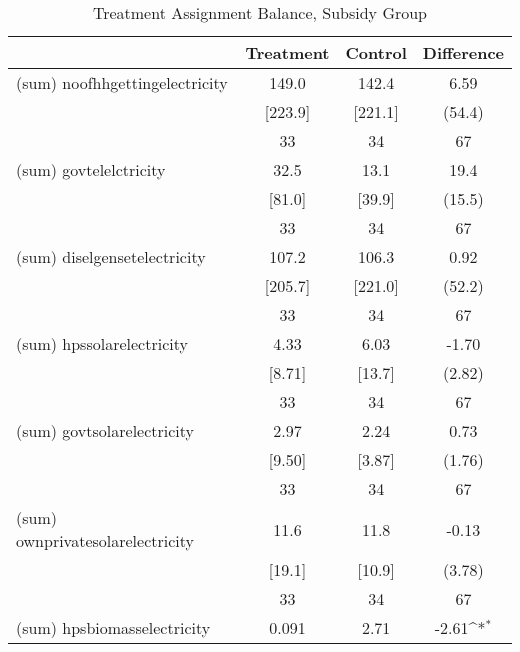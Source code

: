 \begin{table}[htbp]\centering
\def\sym#1{\ifmmode^{#1}\else\(^{#1}\)\fi}
\caption{Treatment Assignment Balance, Subsidy Group \label{tab:"balance"}}
\begin{tabular*}{0.9\hsize}{@{\hskip\tabcolsep\extracolsep\fill}l*{1}{ccc}}
\toprule
                                &Treatment&  Control&Difference         \\
\midrule
(sum) noofhhgettingelectricity  &    149.0&    142.4&     6.59         \\
                                &  [223.9]&  [221.1]&   (54.4)         \\
                                &       33&       34&       67         \\
(sum) govtelelctricity          &     32.5&     13.1&     19.4         \\
                                &   [81.0]&   [39.9]&   (15.5)         \\
                                &       33&       34&       67         \\
(sum) diselgensetelectricity    &    107.2&    106.3&     0.92         \\
                                &  [205.7]&  [221.0]&   (52.2)         \\
                                &       33&       34&       67         \\
(sum) hpssolarelectricity       &     4.33&     6.03&    -1.70         \\
                                &   [8.71]&   [13.7]&   (2.82)         \\
                                &       33&       34&       67         \\
(sum) govtsolarelectricity      &     2.97&     2.24&     0.73         \\
                                &   [9.50]&   [3.87]&   (1.76)         \\
                                &       33&       34&       67         \\
(sum) ownprivatesolarelectricity&     11.6&     11.8&    -0.13         \\
                                &   [19.1]&   [10.9]&   (3.78)         \\
                                &       33&       34&       67         \\
(sum) hpsbiomasselectricity     &    0.091&     2.71&    -2.61\sym{*}  \\

\end{tabular*}
\end{table}
